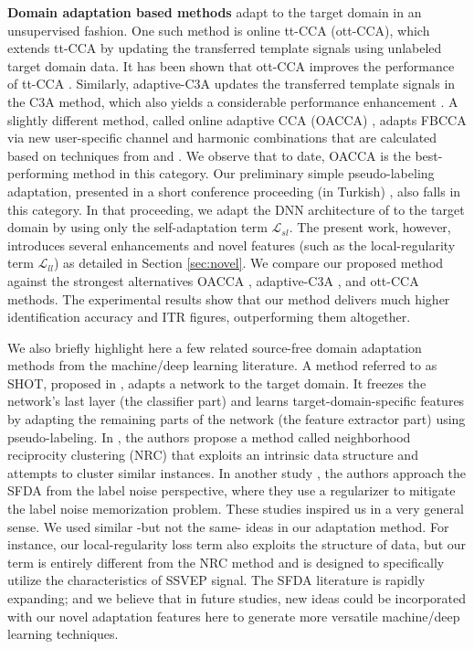 \documentclass[12pt]{iopart}
\begin{document}
{\bf Domain adaptation based methods} adapt to the target domain in an unsupervised fashion. One such method is online tt-CCA (ott-CCA), which extends tt-CCA by updating the transferred template signals using unlabeled target domain data. It has been shown that ott-CCA improves the performance of tt-CCA  \cite{tt-CCA}. Similarly, adaptive-C3A updates the transferred template signals in the C3A method, which also yields a considerable performance enhancement \cite{comb-tCCA}. A slightly different method, called online adaptive CCA (OACCA) \cite{oacca}, adapts FBCCA via new user-specific channel and harmonic combinations that are calculated based on techniques from \cite{PSF} and \cite{msCCA}. We observe that to date, OACCA is the best-performing method in this category. Our preliminary simple pseudo-labeling adaptation, presented in a short conference proceeding (in Turkish) \cite{siu_adaptation}, also falls in this category. In that proceeding, we adapt the DNN architecture of \cite{ournetwork} to the target domain by using only the self-adaptation term $\mathcal{L}_{sl}$. The present work, however, introduces several enhancements and novel features (such as the local-regularity term $\mathcal{L}_{{ll}}$) as detailed in Section \ref{sec:novel}. We compare our proposed method against the strongest alternatives OACCA \cite{oacca}, adaptive-C3A \cite{comb-tCCA}, and ott-CCA \cite{tt-CCA} methods. The experimental results show that our method delivers much higher identification accuracy and ITR figures, outperforming them altogether.

We also briefly highlight here a few related source-free domain adaptation methods from the machine/deep learning literature. A method referred to as SHOT, proposed in \cite{shot_sfda}, adapts a network to the target domain. It freezes the network's last layer (the classifier part) and learns target-domain-specific features by adapting the remaining parts of the network (the feature extractor part) using pseudo-labeling. In \cite{affinity_sfda}, the authors propose a method called neighborhood reciprocity clustering (NRC) that exploits an intrinsic data structure and attempts to cluster similar instances. In another study \cite{lln_sfda}, the authors approach the SFDA from the label noise perspective, where they use a regularizer to mitigate the label noise memorization problem. These studies inspired us in a very general sense. We used similar -but not the same- ideas in our adaptation method. For instance, our local-regularity loss term also exploits the structure of data, but our term is entirely different from the NRC method \cite{lln_sfda} and is designed to specifically utilize the characteristics of SSVEP signal. The SFDA literature is rapidly expanding; and we believe that in future studies, new ideas could be incorporated with our novel adaptation features here to generate more versatile machine/deep learning techniques.
\end{document}
